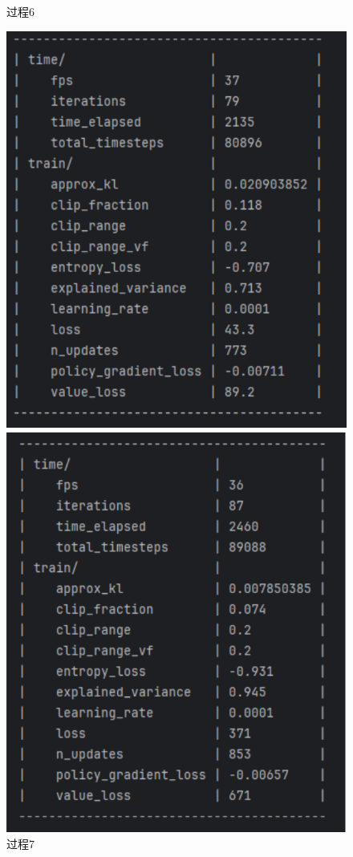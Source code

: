 \begin{figure}[H]
\begin{minipage}{0.25\textwidth}
	   \caption*{过程6}
    \end{minipage}%
    \begin{minipage}{0.25\textwidth}
        \centering
        \includegraphics[width=\textwidth]{images/training7.pdf}
	   \caption*{过程7}
    \end{minipage}%
    \begin{minipage}{0.25\textwidth}
        \centering
        \includegraphics[width=\textwidth]{images/training8.pdf}

\end{minipage}
\end{figure}
